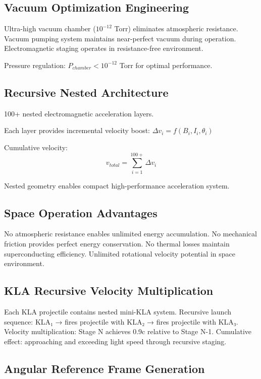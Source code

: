 \documentclass[12pt,a4paper]{article}
\begin{document}
\subsection{Vacuum Optimization Engineering}

Ultra-high vacuum chamber ($10^{-12}$ Torr) eliminates atmospheric resistance. Vacuum pumping system maintains near-perfect vacuum during operation. Electromagnetic staging operates in resistance-free environment.

Pressure regulation: $P_{chamber} < 10^{-12}$ Torr for optimal performance.

\subsection{Recursive Nested Architecture}

100+ nested electromagnetic acceleration layers.

Each layer provides incremental velocity boost: $\Delta v_i = f(B_i, I_i, \theta_i)$

Cumulative velocity:
\begin{equation}
v_{total} = \sum_{i=1}^{100+} \Delta v_i
\end{equation}

Nested geometry enables compact high-performance acceleration system.

\subsection{Space Operation Advantages}

No atmospheric resistance enables unlimited energy accumulation. No mechanical friction provides perfect energy conservation. No thermal losses maintain superconducting efficiency. Unlimited rotational velocity potential in space environment.

\subsection{KLA Recursive Velocity Multiplication}

Each KLA projectile contains nested mini-KLA system. Recursive launch sequence: KLA₁ → fires projectile with KLA₂ → fires projectile with KLA₃. Velocity multiplication: Stage N achieves 0.9c relative to Stage N-1. Cumulative effect: approaching and exceeding light speed through recursive staging.

\subsection{Angular Reference Frame Generation}
\end{document}
